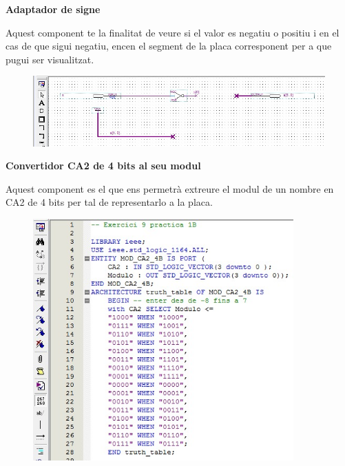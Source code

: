 \documentclass[12pt, a4papre]{article}
\begin{document}
	
	\textbf{\large{Adaptador de signe}}
	
	Aquest component te la finalitat de veure si el valor es negatiu o positiu i en el cas de que sigui negatiu, encen el segment de la placa corresponent per a que pugui ser visualitzat.
	
	\begin{center}
	\begin{figure}[H]
		\begin{center}
		\includegraphics[width=150mm]{adaptSigne.jpeg}
		\end{center}
	\end{figure}
	
	\end{center}
	
	\textbf{\large{Convertidor CA2 de 4 bits al seu modul}}
	
	Aquest component es el que ens permetrà extreure el modul de un nombre en CA2 de 4 bits per tal de representarlo a la placa.
	
	\begin{center}
	\begin{figure}[H]
		\begin{center}
		\includegraphics[width=100mm]{ConvCA2_4aMOD.jpeg}
		\end{center}
	\end{figure}
	
	\end{center}
	
\end{document}
